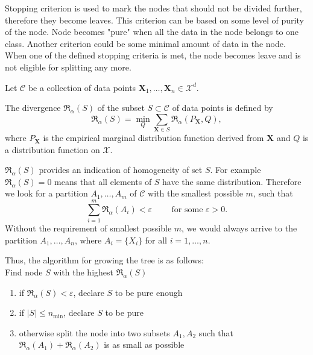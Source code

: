 Stopping criterion is used to mark the nodes that should not be divided further, therefore they become leaves. This criterion can be based on some level of purity of the node. Node becomes "pure" when all the data in the node belongs to one class. Another criterion could be some minimal amount of data in the node. When one of the defined stopping criteria is met, the node becomes leave and is not eligible for splitting any more. 

Let $\mathcal{C}$ be a collection of data points $\mathbf{X}_1,\ldots,\mathbf{X}_n \in \mathcal{X}^d.$

\begin{definition}
The \ren divergence $\mathfrak{R}_\alpha(S)$ of the subset $S\subset \mathcal{C}$ of data points is defined by
\begin{equation}
\mathfrak{R}_\alpha(S) = \min_Q \sum_{\mathbf{X} \in S} \mathfrak{R}_ \alpha(P_\mathbf{X}, Q),
\end{equation}
where $P_\mathbf{X}$ is the empirical marginal distribution function derived from $\mathbf{X}$ and $Q$ is a distribution function on $\mathcal{X}.$ 
\end{definition}

\noindent $\mathfrak{R}_\alpha(S)$ provides an indication of homogeneity of set $S$. For example $\mathfrak{R}_\alpha(S) = 0$ means that all elements of $S$ have the same distribution. Therefore we look for a partition $A_1,\ldots,A_m$ of $\mathcal{C}$ with the smallest possible $m$, such that
\begin{equation}
\sum_{i=1}^m \mathfrak{R}_\alpha(A_i) < \varepsilon \qquad \text{ for some } \varepsilon > 0.
\end{equation}
Without the requirement of smallest possible $m$, we would always arrive to the partition $A_1,\ldots,A_n$, where $A_i = \lbrace X_i\rbrace$ for all $i=1,\ldots,n.$ 

Thus, the algorithm for growing the tree is as follows:\\

Find node $S$ with the highest $\mathfrak{R}_\alpha(S)$
\begin{enumerate}
\item if $\mathfrak{R}_\alpha(S) < \varepsilon$, declare $S$ to be  pure enough
\item if $|S| \leq n_\mathrm{min}$, declare $S$ to be pure
\item otherwise split the node into two subsets $A_1, A_2 $ such that $\mathfrak{R}_\alpha(A_1) + \mathfrak{R}_\alpha(A_2)$ is as small as possible \label{step}
\end{enumerate}


